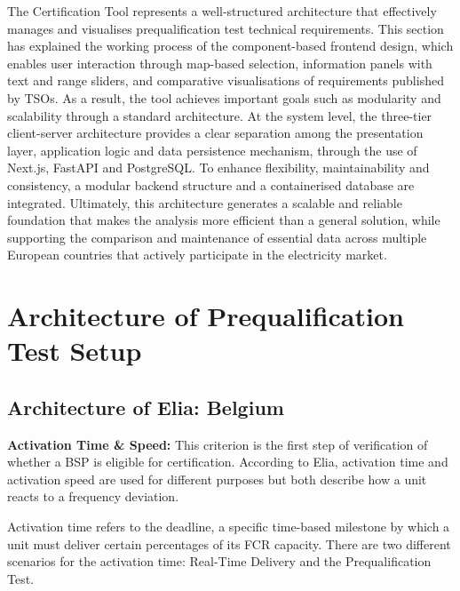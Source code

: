The Certification Tool represents a well-structured architecture that effectively manages and visualises prequalification test technical requirements. This section has explained the working process of the component-based frontend design, which enables user interaction through map-based selection, information panels with text and range sliders, and comparative visualisations of requirements published by TSOs. As a result, the tool achieves important goals such as modularity and scalability through a standard architecture. At the system level, the three-tier client-server architecture provides a clear separation among the presentation layer, application logic and data persistence mechanism, through the use of Next.js, FastAPI and PostgreSQL. To enhance flexibility, maintainability and consistency, a modular backend structure and a containerised database are integrated. Ultimately, this architecture generates a scalable and reliable foundation that makes the analysis more efficient than a general solution, while supporting the comparison and maintenance of essential data across multiple European countries that actively participate in the electricity market.


\section{Architecture of Prequalification Test Setup}

\subsection{Architecture of Elia: Belgium}

\textbf{Activation Time \& Speed:} This criterion is the first step of verification of whether a BSP is eligible for certification. According to Elia, activation time and activation speed are used for different purposes but both describe how a unit reacts to a frequency deviation.

Activation time refers to the deadline, a specific time-based milestone by which a unit must deliver certain percentages of its FCR capacity. There are two different scenarios for the activation time: Real-Time Delivery and the Prequalification Test.

